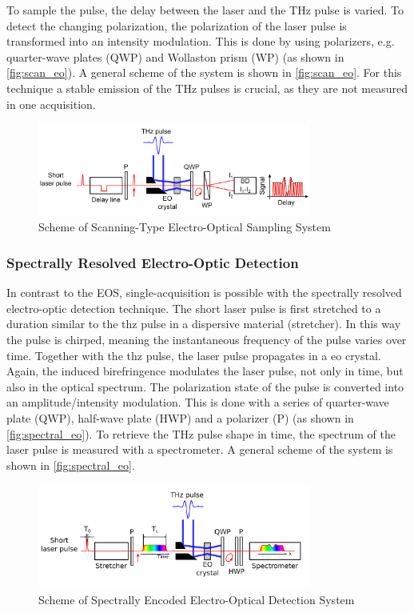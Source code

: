 To sample the pulse, the delay between the laser and the THz pulse is varied.
To detect the changing polarization, the polarization of the laser pulse is transformed into an intensity modulation. This is done by using polarizers, e.g. quarter-wave plates (QWP) and Wollaston prism (WP) (as shown in \autoref{fig:scan_eo}).
A general scheme of the system is shown in \autoref{fig:scan_eo}.
For this technique a stable emission of the THz pulses is crucial, as they are not measured in one acquisition. \cite{roussel2014}
\begin{figure}[tbh]
	\centering
	\includegraphics[width = 0.8\textwidth]{chap/02-theory/img/scanning_eo}
	\caption{Scheme of Scanning-Type Electro-Optical Sampling System \cite{roussel2014}}
	\label{fig:scan_eo}
\end{figure}

\subsubsection*{Spectrally Resolved Electro-Optic Detection}
In contrast to the EOS, single-acquisition is possible with the spectrally resolved electro-optic detection technique.
The short laser pulse is first stretched to a duration similar to the \gls{thz} pulse in a dispersive material (stretcher).
In this way the pulse is chirped, meaning the instantaneous frequency of the pulse varies over time.
Together with the \gls{thz} pulse, the laser pulse propagates in a \gls{eo} crystal.
Again, the induced birefringence modulates the laser pulse, not only in time, but also in the optical spectrum.
The polarization state of the pulse is converted into an amplitude/intensity modulation.
This is done with a series of quarter-wave plate (QWP), half-wave plate (HWP) and a polarizer (P) (as shown in \autoref{fig:spectral_eo}).
To retrieve the THz pulse shape in time, the spectrum of the laser pulse is measured with a spectrometer. %
A general scheme of the system is shown in \autoref{fig:spectral_eo}. \cite{roussel2014}

\begin{figure}[tbh]
	\centering
	\includegraphics[width = 0.8\textwidth]{chap/02-theory/img/spectral_eo}
	\caption{Scheme of Spectrally Encoded Electro-Optical Detection System \cite{roussel2014}}
	\label{fig:spectral_eo}
\end{figure}

